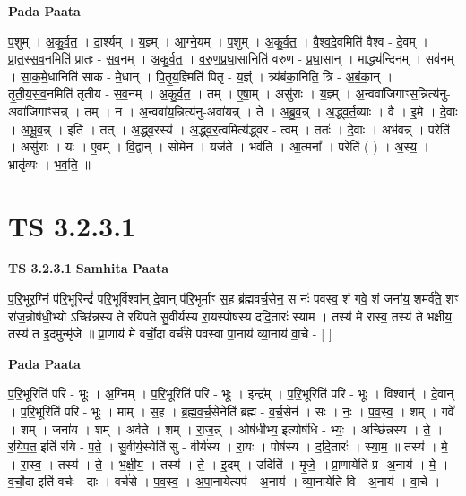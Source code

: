\documentclass[17pt]{extarticle}
\begin{document}
\textbf{Pada Paata} \newline

प॒शुम् । अ॒कु॒र्व॒त॒ । दा॒र्श्यम् । य॒ज्ञ्म् । आ॒ग्ने॒यम् । प॒शुम् । अ॒कु॒र्व॒त॒ । वै॒श्व॒दे॒वमिति॑ वैश्व - दे॒वम् । प्रा॒त॒स्स॒व॒नमिति॑ प्रातः - स॒व॒नम् । अ॒कु॒र्व॒त॒ । व॒रु॒ण॒प्र॒घा॒सानिति॑ वरुण - प्र॒घा॒सान् । माद्ध्य॑न्दिनम् । सव॑नम् । सा॒क॒मे॒धानिति॑ साक - मे॒धान् । पि॒तृ॒य॒ज्ञ्मिति॑ पितृ - य॒ज्ञ्ं । त्र्य॑बंका॒निति॒ त्रि - अ॒बं॒का॒न् । तृ॒ती॒य॒स॒व॒नमिति॑ तृतीय - स॒व॒नम् । अ॒कु॒र्व॒त॒ । तम् । ए॒षा॒म् । असु॑राः । य॒ज्ञ्म् । अ॒न्ववा॑जिगाꣳस॒न्नित्य॑नु-अवा॑जिगाꣳसन्न् । तम् । न । अ॒न्ववा॑य॒न्नित्य॑नु-अवा॑यन्न् । ते । अ॒ब्रु॒व॒न्न् । अ॒द्ध्व॒र्त॒व्याः । वै । इ॒मे । दे॒वाः । अ॒भू॒व॒न्न् । इति॑ । तत् । अ॒द्ध्व॒रस्य॑ । अ॒द्ध्व॒र॒त्वमित्य॑द्ध्वर - त्वम् । ततः॑ । दे॒वाः । अभ॑वन्न् । परेति॑ । असु॑राः । यः । ए॒वम् । वि॒द्वान् । सोमे॑न । यज॑ते । भव॑ति । आ॒त्मना᳚ । परेति॑ ( ) । अ॒स्य॒ । भ्रातृ॑व्यः । भ॒व॒ति॒ ॥  \newline





\section{ TS 3.2.3.1 }

\textbf{TS 3.2.3.1 } \newline
\textbf{Samhita Paata} \newline

प॒रि॒भूर॒ग्निं प॑रि॒भूरिन्द्रं॑ परि॒भूर्विश्वा᳚न् दे॒वान् प॑रि॒भूर्माꣳ स॒ह ब्र॑ह्मवर्च॒सेन॒ स नः॑ पवस्व॒ शं गवे॒ शं जना॑य॒ शमर्व॑ते॒ शꣳ रा॑ज॒न्नोष॑धी॒भ्यो ऽच्छि॑न्नस्य ते रयिपते सु॒वीर्य॑स्य रा॒यस्पोष॑स्य ददि॒तारः॑ स्याम । तस्य॑ मे रास्व॒ तस्य॑ ते भक्षीय॒ तस्य॑ त इ॒दमुन्मृ॑जे ॥ प्रा॒णाय॑ मे वर्चो॒दा वर्च॑से पवस्वा पा॒नाय॑ व्या॒नाय॑ वा॒चे - [  ] \newline

\textbf{Pada Paata} \newline

प॒रि॒भूरिति॑ परि - भूः । अ॒ग्निम् । प॒रि॒भूरिति॑ परि - भूः । इन्द्र᳚म् । प॒रि॒भूरिति॑ परि - भूः । विश्वान्॑ । दे॒वान् । प॒रि॒भूरिति॑ परि - भूः । माम् । स॒ह । ब्र॒ह्म॒व॒र्च॒सेनेति॑ ब्रह्म - व॒र्च॒सेन॑ । सः । नः॒ । प॒व॒स्व॒ । शम् । गवे᳚ । शम् । जना॑य । शम् । अर्व॑ते । शम् । रा॒ज॒न्न् । ओष॑धीभ्य॒ इत्योष॑धि - भ्यः॒ । अच्छि॑न्नस्य । ते॒ । र॒यि॒प॒त॒ इति॑ रयि - प॒ते॒ । सु॒वीर्य॒स्येति॑ सु - वीर्य॑स्य । रा॒यः । पोष॑स्य । द॒दि॒तारः॑ । स्या॒म॒ ॥ तस्य॑ । मे॒ । रा॒स्व॒ । तस्य॑ । ते॒ । भ॒क्षी॒य॒ । तस्य॑ । ते॒ । इ॒दम् । उदिति॑ । मृ॒जे॒ ॥ प्रा॒णायेति॑ प्र -अ॒नाय॑ । मे॒ । व॒र्चो॒दा इति॑ वर्चः - दाः । वर्च॑से । प॒व॒स्व॒ । अ॒पा॒नायेत्यप॑ - अ॒नाय॑ । व्या॒नायेति॑ वि - अ॒नाय॑ । वा॒चे ।  \newline
\end{document}
